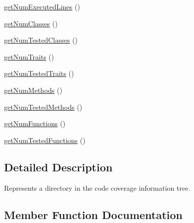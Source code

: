 \begin{DoxyCompactItemize}
\mbox{\hyperlink{class_sebastian_bergmann_1_1_code_coverage_1_1_node_1_1_directory_acfa55061fa6bf0b24060b1fb9f23df6c}{get\+Num\+Executed\+Lines}} ()
\item 
\mbox{\hyperlink{class_sebastian_bergmann_1_1_code_coverage_1_1_node_1_1_directory_acf97fce0343831a33e60ef9c674c4f94}{get\+Num\+Classes}} ()
\item 
\mbox{\hyperlink{class_sebastian_bergmann_1_1_code_coverage_1_1_node_1_1_directory_a1ca8b300e7accd8d285719e26a920349}{get\+Num\+Tested\+Classes}} ()
\item 
\mbox{\hyperlink{class_sebastian_bergmann_1_1_code_coverage_1_1_node_1_1_directory_a8b1689472c8328bd77d2133c0d8f3c19}{get\+Num\+Traits}} ()
\item 
\mbox{\hyperlink{class_sebastian_bergmann_1_1_code_coverage_1_1_node_1_1_directory_a9f4b03b1f2e8b5d93df2619def56c03f}{get\+Num\+Tested\+Traits}} ()
\item 
\mbox{\hyperlink{class_sebastian_bergmann_1_1_code_coverage_1_1_node_1_1_directory_a33d2a6d8c0d0dac6266c308b69500df8}{get\+Num\+Methods}} ()
\item 
\mbox{\hyperlink{class_sebastian_bergmann_1_1_code_coverage_1_1_node_1_1_directory_a48f8ec1c354ab177280088a1ddf90439}{get\+Num\+Tested\+Methods}} ()
\item 
\mbox{\hyperlink{class_sebastian_bergmann_1_1_code_coverage_1_1_node_1_1_directory_aa38acc99dd8fc7d59b28b396c2d9d07a}{get\+Num\+Functions}} ()
\item 
\mbox{\hyperlink{class_sebastian_bergmann_1_1_code_coverage_1_1_node_1_1_directory_a6697408b128d1bb88427a2789d7bc6e8}{get\+Num\+Tested\+Functions}} ()
\end{DoxyCompactItemize}


\subsection{Detailed Description}
Represents a directory in the code coverage information tree. 

\subsection{Member Function Documentation}
\mbox{\label{class_sebastian_bergmann_1_1_code_coverage_1_1_node_1_1_directory_a1a418de89a53c74e230f440c3b8dd3a1}} 

